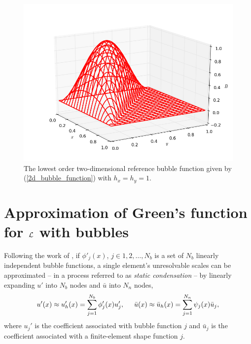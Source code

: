 
\begin{figure}
  \centering
    \includegraphics[width=\linewidth]{images/bubbles/2d_bubble.png}
  \caption[Two-dimensional bubble function]{The lowest order two-dimensional reference bubble function given by (\ref{2d_bubble_function}) with $h_x = h_y = 1$.}
  \label{2d_bubble_image}
\end{figure}


\section{Approximation of Green's function for $\mathcal{L}$ with bubbles}

Following the work of \citet{hughes_1995}, if $\phi'_j(x)$, $j \in 1,2,\ldots,N_b$ is a set of $N_b$ linearly independent bubble functions, a single element's unresolvable scales can be approximated -- in a process referred to as  \emph{static condensation} -- by linearly expanding $u'$ into $N_b$ nodes and $\bar{u}$ into $N_n$ nodes,
\begin{align}
  \label{bubble_u_approximation}
  u'(x) \approx u_h'(x) = \sum_{j=1}^{N_b} \phi_j'(x) u_j', \hspace{5mm} \bar{u}(x) \approx \bar{u}_h(x) = \sum_{j=1}^{N_n} \psi_j(x) \bar{u}_j,
\end{align}
where $u_j'$ is the coefficient associated with bubble function $j$ and $\bar{u}_j$ is the coefficient associated with a finite-element shape function $j$.

